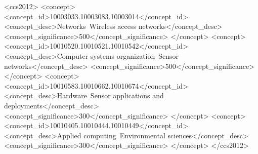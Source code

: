 \documentclass[acmsmall,screen]{acmart}
\begin{document}
\begin{abstract}
Remote conservation sites often require reliable alerts from traps, camera stations, and environmental sensors in places where terrestrial communications infrastructure is absent and satellite communication is expensive or power intensive. This paper presents BearWave as an open-source and open-hardware monitoring system for conservation organisations that need to build, maintain, and adapt their own low-bandwidth field infrastructure. Building on earlier work that validated Near Vertical Incidence Skywave (NVIS) communication for rainforest monitoring, this paper focuses on the complete deployable system: the control node, the remote node hardware, the ESP32 supervisory firmware, the Raspberry Pi software, the compact message format used to convert local sensor events into long-haul HF alerts, and an alarm-triggered slow-scan television (SSTV) still-image extension for visual verification. The primary system function remains reliable low-power alarm messaging; image transfer is treated as optional best-effort context rather than as the authoritative alarm channel. The manuscript is structured as a reproducible system paper in the style of open ecological hardware reports, documenting design rationale, assembly and validation requirements, power-management strategy, operating modes, operator display, image workflow, and deployment constraints. 
\end{abstract}

\begin{CCSXML}
<ccs2012>
 <concept>
  <concept_id>10003033.10003083.10003014</concept_id>
  <concept_desc>Networks~Wireless access networks</concept_desc>
  <concept_significance>500</concept_significance>
 </concept>
 <concept>
  <concept_id>10010520.10010521.10010542</concept_id>
  <concept_desc>Computer systems organization~Sensor networks</concept_desc>
  <concept_significance>500</concept_significance>
 </concept>
 <concept>
  <concept_id>10010583.10010662.10010674</concept_id>
  <concept_desc>Hardware~Sensor applications and deployments</concept_desc>
  <concept_significance>300</concept_significance>
 </concept>
 <concept>
  <concept_id>10010405.10010444.10010449</concept_id>
  <concept_desc>Applied computing~Environmental sciences</concept_desc>
  <concept_significance>300</concept_significance>
 </concept>
</ccs2012>
\end{CCSXML}
\end{document}
